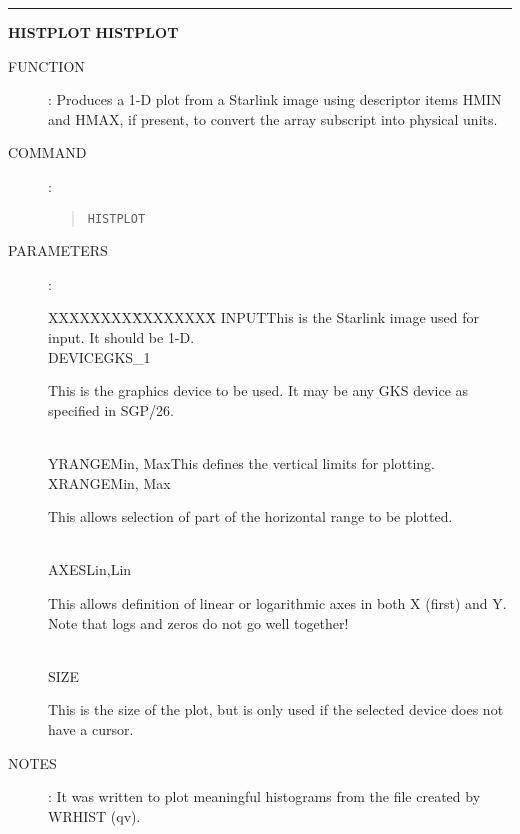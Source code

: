 \goodbreak
\rule{\textwidth}{0.3mm}
{\Large {\bf HISTPLOT} \hfill {\bf HISTPLOT}}
\begin{description}
\item [FUNCTION]:
Produces a 1-D plot from a Starlink image using descriptor items HMIN and
HMAX, if present, to convert the array subscript into physical units.
\item [COMMAND]:
\begin{quote}
{\tt HISTPLOT}
\end{quote}
\item [PARAMETERS] :
\begin{tabbing}
XXXXXXXX\=XXXXXXXX\=\kill
INPUT\>\>This is the Starlink image used for input. It should be 1-D.\\
DEVICE\>GKS\_1\>\begin{minipage}[t]{100mm}
This is the graphics device to be used.
It may be any GKS device as specified in SGP/26.
\end{minipage}\\
YRANGE\>Min, Max\>This defines the vertical limits for plotting.\\
XRANGE\>Min, Max\>\begin{minipage}[t]{100mm}
This allows selection of part of the horizontal range to be plotted.
\end{minipage}\\
AXES\>Lin,Lin\>\begin{minipage}[t]{100mm}
This allows definition of linear or logarithmic axes in both X (first) and Y.
Note that logs and zeros do not go well together!
\end{minipage}\\
SIZE\>\>\begin{minipage}[t]{100mm}
This is the size of the plot, but is only used if the selected device does
not have a cursor.
\end{minipage}
\end{tabbing}
\item [NOTES]:
It was written to plot meaningful histograms from the file created by WRHIST
(qv).
\end{description}

